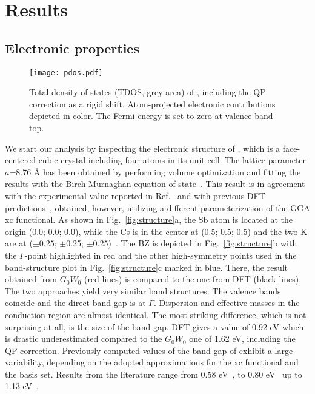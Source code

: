 \documentclass[aps,pra,superscriptaddress,twocolumn]{revtex4}
\begin{document}
\section{Results}
\label{section:results}
\subsection{Electronic properties}
%
\begin{figure}
\center
\texttt{[image: pdos.pdf]}
\caption{Total density of states (TDOS, grey area) of , including the QP correction as a rigid shift. Atom-projected electronic contributions depicted in color. The Fermi energy is set to zero at valence-band top.}
\label{fig:pdos}
\end{figure} 
%
We start our analysis by inspecting the electronic structure of , which is a face-centered cubic crystal including four atoms in its unit cell.
The lattice parameter $a$=8.76 \AA{} has been obtained by performing volume optimization and fitting the results with the Birch-Murnaghan equation of state~\cite{birch,murnaghan}.
This result is in agreement with the experimental value reported in Ref.~\cite{somm63apl} and with previous DFT predictions~\cite{kala+10jpcs,murt+16bms}, obtained, however, utilizing a different parameterization of the GGA xc functional.
As shown in Fig.~\ref{fig:structure}a, the Sb atom is located at the origin (0.0; 0.0; 0.0), while the Cs is in the center at (0.5; 0.5; 0.5) and the two K are at ($\pm$0.25; $\pm$0.25; $\pm$0.25)~\cite{ette-degr02prb}.
The BZ is depicted in Fig.~\ref{fig:structure}b with the $\Gamma$-point highlighted in red and the other high-symmetry points used in the band-structure plot in Fig.~\ref{fig:structure}c marked in blue.
There, the result obtained from $G_0W_0$ (red lines) is compared to the one from DFT (black lines).
The two approaches yield very similar band structures: The valence bands coincide and the direct band gap is at $\Gamma$.
Dispersion and effective masses in the conduction region are almost identical.
The most striking difference, which is not surprising at all, is the size of the band gap.
DFT gives a value of 0.92 eV which is drastic underestimated compared to the $G_0W_0$ one of 1.62 eV, including the QP correction.
Previously computed values of the band gap of  exhibit a large variability, depending on the adopted approximations for the xc functional and the basis set.
Results from the literature range from 0.58 eV~\cite{ette-degr02prb}, to 0.80 eV~\cite{murt+16bms} up to 1.13 eV~\cite{kala+10jpcs}.
\end{document}
